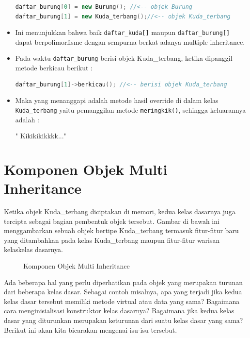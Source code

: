 \begin{itemize}
\begin{lstlisting}[language=c++, numbers=none]
daftar_burung[0] = new Burung(); //<-- objek Burung
daftar_burung[1] = new Kuda_terbang();//<-- objek Kuda_terbang
\end{lstlisting}
\item
  Ini menunjukkan bahwa baik \texttt{daftar\_kuda{[}{]}} maupun
  \texttt{daftar\_burung{[}{]}} dapat berpolimorfisme dengan sempurna
  berkat adanya multiple inheritance.
\item
  Pada waktu \texttt{daftar\_burung} berisi objek Kuda\_terbang, ketika
  dipanggil metode berkicau berikut :

\begin{lstlisting}[language=c++, numbers=none]
daftar_burung[1]->berkicau(); //<-- berisi objek Kuda_terbang
\end{lstlisting}
\item
  Maka yang menanggapi adalah metode hasil override di dalam kelas
  \texttt{Kuda\_terbang} yaitu pemanggilan metode \texttt{meringkik()},
  sehingga keluarannya adalah :

\begin{lcverbatim}
" Kikikikikkkk..."
\end{lcverbatim}
\end{itemize}

\section{Komponen Objek Multi Inheritance}\label{komponen-objek-multi-inheritance}

Ketika objek Kuda\_terbang diciptakan di memori, kedua kelas dasarnya
juga tercipta sebagai bagian pembentuk objek tersebut. Gambar di bawah
ini menggambarkan sebuah objek bertipe Kuda\_terbang termasuk
fitur-fitur baru yang ditambahkan pada kelas Kuda\_terbang maupun
fitur-fitur warisan kelaskelas dasarnya.

\begin{figure}[htbp]
\centering
{}
\caption{Komponen Objek Multi Inheritance}
\end{figure}

Ada beberapa hal yang perlu diperhatikan pada objek yang merupakan
turunan dari beberapa kelas dasar. Sebagai contoh misalnya, apa yang
terjadi jika kedua kelas dasar tersebut memiliki metode virtual atau
data yang sama? Bagaimana cara menginisialisasi konstruktor kelas
dasarnya? Bagaimana jika kedua kelas dasar yang diturunkan merupakan
keturunan dari suatu kelas dasar yang sama? Berikut ini akan kita
bicarakan mengenai isu-isu tersebut.

